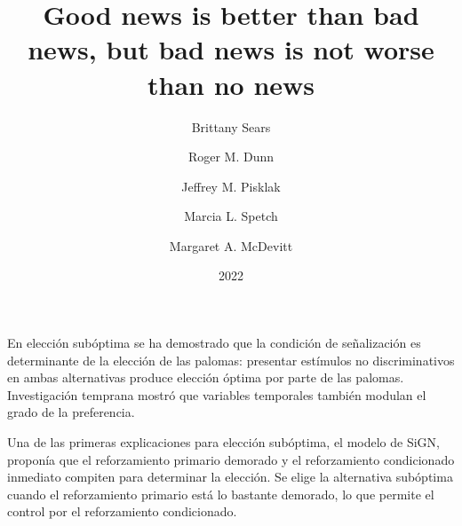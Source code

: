\documentclass[a4paper,12pt]{article}
\title{Good news is better than bad news, but bad news is not worse than no news}
\author{Brittany Sears \and Roger M. Dunn \and Jeffrey M. Pisklak \and Marcia L. Spetch \and Margaret A. McDevitt}
\date{2022}
\begin{document}
{\scshape\bfseries \maketitle}

En elección subóptima se ha demostrado que la condición de señalización es determinante de la elección de las palomas: presentar estímulos no discriminativos en ambas alternativas produce elección óptima por parte de las palomas.
Investigación temprana mostró que variables temporales también modulan el grado de la preferencia.

Una de las primeras explicaciones para elección subóptima, el modelo de SiGN, proponía que el reforzamiento primario demorado y el reforzamiento condicionado inmediato compiten para determinar la elección. Se elige la alternativa subóptima cuando el reforzamiento primario está lo bastante demorado, lo que permite el control por el reforzamiento condicionado.
\end{document}
